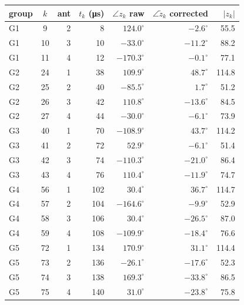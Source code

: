 \documentclass[11pt,a4paper]{article}
\begin{document}
\begin{center}
\begin{tabular}{lcrrrrr}
\toprule
group & $k$ & ant & $t_k$ (\si{\micro s}) & $\angle z_k$ raw & $\angle\tilde z_k$ corrected & $|z_k|$ \\
\midrule
G1 & 9  & 2 & 8   & $124.0^\circ$  & $-2.6^\circ$  & 55.5 \\
G1 & 10 & 3 & 10  & $-33.0^\circ$  & $-11.2^\circ$ & 88.2 \\
G1 & 11 & 4 & 12  & $-170.3^\circ$ & $-0.1^\circ$  & 77.1 \\
\midrule
G2 & 24 & 1 & 38  & $109.9^\circ$  & $48.7^\circ$  & 114.8 \\
G2 & 25 & 2 & 40  & $-85.5^\circ$  & $1.7^\circ$   & 51.2 \\
G2 & 26 & 3 & 42  & $110.8^\circ$  & $-13.6^\circ$ & 84.5 \\
G2 & 27 & 4 & 44  & $-30.0^\circ$  & $-6.1^\circ$  & 73.9 \\
\midrule
G3 & 40 & 1 & 70  & $-108.9^\circ$ & $43.7^\circ$  & 114.2 \\
G3 & 41 & 2 & 72  & $52.9^\circ$   & $-6.1^\circ$  & 51.4 \\
G3 & 42 & 3 & 74  & $-110.3^\circ$ & $-21.0^\circ$ & 86.4 \\
G3 & 43 & 4 & 76  & $110.4^\circ$  & $-11.9^\circ$ & 74.7 \\
\midrule
G4 & 56 & 1 & 102 & $30.4^\circ$   & $36.7^\circ$  & 114.7 \\
G4 & 57 & 2 & 104 & $-164.6^\circ$ & $-9.9^\circ$  & 52.9 \\
G4 & 58 & 3 & 106 & $30.4^\circ$   & $-26.5^\circ$ & 87.0 \\
G4 & 59 & 4 & 108 & $-109.9^\circ$ & $-18.4^\circ$ & 76.6 \\
\midrule
G5 & 72 & 1 & 134 & $170.9^\circ$  & $31.1^\circ$  & 114.4 \\
G5 & 73 & 2 & 136 & $-26.1^\circ$  & $-17.6^\circ$ & 52.3 \\
G5 & 74 & 3 & 138 & $169.3^\circ$  & $-33.8^\circ$ & 86.5 \\
G5 & 75 & 4 & 140 & $31.0^\circ$   & $-23.8^\circ$ & 75.8 \\
\bottomrule
\end{tabular}
\end{center}
\end{document}
